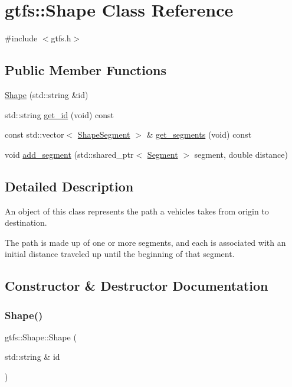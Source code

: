 \hypertarget{classgtfs_1_1Shape}{}\section{gtfs\+:\+:Shape Class Reference}
\label{classgtfs_1_1Shape}


{\ttfamily \#include $<$gtfs.\+h$>$}

\subsection*{Public Member Functions}
\begin{DoxyCompactItemize}
\item 
\hyperlink{classgtfs_1_1Shape_ace6a58f57452ab0d2830b518a0ed2bde}{Shape} (std\+::string \&id)
\item 
std\+::string \hyperlink{classgtfs_1_1Shape_ad8f8c0c5c19d4a8e840be1ed9a89de9e}{get\+\_\+id} (void) const
\item 
const std\+::vector$<$ \hyperlink{structgtfs_1_1ShapeSegment}{Shape\+Segment} $>$ \& \hyperlink{classgtfs_1_1Shape_ab6959c8c957c2548313e4cf76bd2a2dd}{get\+\_\+segments} (void) const
\item 
void \hyperlink{classgtfs_1_1Shape_afb5bfd99bafb82eb085198218fe13342}{add\+\_\+segment} (std\+::shared\+\_\+ptr$<$ \hyperlink{classgtfs_1_1Segment}{Segment} $>$ segment, double distance)
\end{DoxyCompactItemize}


\subsection{Detailed Description}
An object of this class represents the path a vehicles takes from origin to destination.

The path is made up of one or more segments, and each is associated with an initial distance traveled up until the beginning of that segment. 

\subsection{Constructor \& Destructor Documentation}
\mbox{\label{classgtfs_1_1Shape_ace6a58f57452ab0d2830b518a0ed2bde}} 
\subsubsection{\texorpdfstring{Shape()}{Shape()}}
{\footnotesize\ttfamily gtfs\+::\+Shape\+::\+Shape (\begin{DoxyParamCaption}\item[{std\+::string \&}]{id }\end{DoxyParamCaption})\hspace{0.3cm}{\ttfamily [inline]}}

